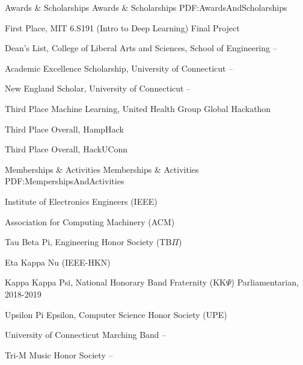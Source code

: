 \documentclass[letterpaper,MMMyyyy,nonstopmode]{simpleresumecv}
\begin{document}
\begin{Body}
\Section
{Awards \&\newline
Scholarships}
{Awards \& Scholarships}
{PDF:AwardsAndScholarships}

\BulletItem
First Place, MIT 6.S191 (Intro to Deep Learning) Final Project
\hfill
{}

\BulletItem
Dean's List,
College of Liberal Arts and Sciences, School of Engineering
\hfill
{} --

\Gap
\BulletItem
Academic Excellence Scholarship, University of Connecticut
\hfill
{} -- 

\Gap
\BulletItem
New England Scholar, University of Connecticut
\hfill
{} -- 

\Gap
\BulletItem
Third Place Machine Learning, United Health Group Global Hackathon
\hfill
{}

\Gap
\BulletItem
Third Place Overall, HampHack
\hfill
{}

\Gap
\BulletItem
Third Place Overall, HackUConn
\hfill
{}


\Section
{Memberships\newline
\& Activities}
{Memberships \& Activities}
{PDF:MempershipsAndActivities}

\BulletItem
{Institute of Electronics Engineers (IEEE)}
\hfill
\Gap

\BulletItem
{Association for Computing Machinery (ACM)}
\hfill
\Gap

\BulletItem
{Tau Beta Pi, Engineering Honor Society (TB$\Pi$)}
\hfill
\Gap

\BulletItem
{Eta Kappa Nu (IEEE-HKN)}
\hfill
\Gap

\BulletItem
{Kappa Kappa Psi, National Honorary Band Fraternity (KK$\Psi$)}
\hfill
\SubBulletItem
{Parliamentarian, 2018-2019}
\Gap

\BulletItem
{Upsilon Pi Epsilon, Computer Science Honor Society (UPE)}
\hfill
\Gap

\BulletItem
{University of Connecticut Marching Band}
\hfill
{} -- 
\Gap

\BulletItem
{Tri-M Music Honor Society}
\hfill
{} -- 
\BigGap


\end{Body}
\end{document}
